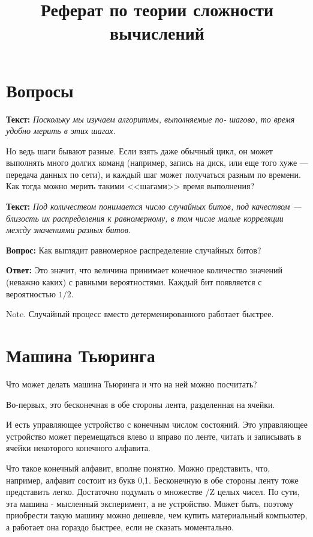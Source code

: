 \documentclass{article}
\title{Реферат по теории сложности вычислений}
\newcommand{\te}{\textbf{Текст: }}
\newcommand{\qu}{\textbf{Вопрос: }}
\newcommand{\an}{\textbf{Ответ: }}
\begin{document}
\maketitle

\tableofcontents

\section{Вопросы}

\te \textit{Поскольку мы изучаем алгоритмы, выполняемые по- шагово, то время удобно мерить в этих шагах.}

Но ведь шаги бывают разные. Если взять даже обычный цикл, он может выполнять много долгих команд (например, запись на диск, или еще того хуже --- передача данных по сети), и каждый шаг может получаться разным по времени. Как тогда можно мерить такими <<шагами>> время выполнения?

\te \textit{Под количеством понимается число случайных битов, под качеством --- близость их распределения к равномерному, в том числе малые корреляции между значениями разных битов.}

\qu Как выглядит равномерное распределение случайных битов?

\an Это значит, что величина принимает конечное количество значений (неважно каких) с равными вероятностями. Каждый бит появляется с вероятностью $1/2$.


Note. Случайный процесс вместо детерменированного работает быстрее.

\section{Машина Тьюринга}
Что может делать машина Тьюринга и что на ней можно посчитать?

Во-первых, это бесконечная в обе стороны лента, разделенная на ячейки.

И есть управляющее устройство с конечным числом состояний. 
Это управляющее устройство может перемещаться влево и вправо по ленте, читать и записывать в ячейки некоторого конечного алфавита.

Что такое конечный алфавит, вполне понятно. Можно представить, что, например, алфавит состоит из букв {0,1}. 
Бесконечную в обе стороны ленту тоже представить легко. Достаточно подумать о множестве /Z целых чисел.
По сути, эта машина - мысленный эксперимент, а не устройство. 
Может быть, поэтому приобрести такую машину можно дешевле, чем купить материальный компьютер, а работает она гораздо быстрее, если не сказать моментально.
\end{document}
